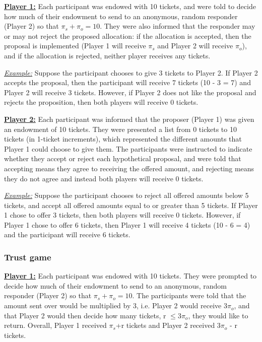 \documentclass[12pt]{article}
\begin{document}
\underline{\textbf{Player 1:}} Each participant was endowed with 10 tickets, and were told to decide how much of their endowment to send to an anonymous, random responder (Player 2) so that \(\pi_{s} + \pi_{o} = 10\). They were also informed that the responder may or may not reject the proposed allocation: if the allocation is accepted, then the proposal is implemented (Player 1 will receive \(\pi_{s}\) and Player 2 will receive \(\pi_{o}\)), and if the allocation is rejected, neither player receives any tickets.

 \underline{\textit{Example:}} Suppose the participant chooses to give 3 tickets to Player 2. If Player 2 accepts the proposal, then the participant will receive 7 tickets (10 - 3 = 7) and Player 2 will receive 3 tickets. However, if Player 2 does not like the proposal and rejects the proposition, then both players will receive 0 tickets.
 
\underline{\textbf{Player 2:}} Each participant was informed that the proposer (Player 1) was given an endowment of 10 tickets. They were presented a list from 0 tickets to 10 tickets (in 1-ticket increments), which represented the different amounts that Player 1 could choose to give them. The participants were instructed to indicate whether they accept or reject each hypothetical proposal, and were told that accepting means they agree to receiving the offered amount, and rejecting means they do not agree and instead both players will receive 0 tickets.

\underline{\textit{Example:}} Suppose the participant chooses to reject all offered amounts below 5 tickets, and accept all offered amounts equal to or greater than 5 tickets. If Player 1 chose to offer 3 tickets, then both players will receive 0 tickets. However, if Player 1 chose to offer 6 tickets, then Player 1 will receive 4 tickets (10 - 6 = 4) and the participant will receive 6 tickets.

	
\subsubsection{Trust game}
\underline{\textbf{Player 1:}} Each participant was endowed with 10 tickets. They were prompted to decide how much of their endowment to send to an anonymous, random responder (Player 2) so that \(\pi_{s} + \pi_{o} = 10\). The participants were told that the amount sent over would be multiplied by 3, i.e. Player 2 would receive 3\(\pi_{o}\), and that Player 2 would then decide how many tickets, r \(\leq 3\pi_{o}\), they would like to return. Overall, Player 1 received \(\pi_{s}\)+r tickets and Player 2 received 3\(\pi_{o}\) - r tickets.
\end{document}
